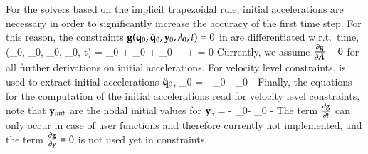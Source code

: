 %
For the solvers based on the implicit trapezoidal rule, initial accelerations are necessary in order to significantly increase the accuracy
of the first time step.
For this reason, the constraints $\mathbf{g}(\mathbf{q}_0, \dot {\mathbf{q}}_0, \mathbf{y}_0, \mbox{\boldmath $\lambda$ \unboldmath}\!\!_0, t) = 0$ in  are differentiated w.r.t.\ time,
\be \label{eq_initialAccelerationsVel}
	\dot \gv(\qv_0, \dot \qv_0, \yv_0, \tlambda_0, t) = 
	\frac{\partial \gv}{\partial \qv} \dot \qv_0 + 
	\frac{\partial \gv}{\partial \dot \qv}\ddot \qv_0 +
	\frac{\partial \gv}{\partial \yv} \dot \yv_0 + 
	\frac{\partial \gv}{\partial \tlambda} \dot \tlambda +
	 = 0 \eqDot 
\ee
Currently, we assume $\frac{\partial \mathbf{g}}{\partial \mbox{\boldmath $\lambda$ \unboldmath}\!\!} = 0$ for all further derivations on initial accelerations.
For velocity level constraints,  is used to extract initial accelerations $\ddot {\mathbf{q}}_0$,
\be
  \frac{\partial \gv}{\partial \dot \qv}\ddot \qv_0 = %
	  -\frac{\partial \gv}{\partial \qv} \dot \qv_0 
		-\frac{\partial \gv}{\partial \yv} \dot \yv_0
		-	 \eqDot
\ee
%
Finally, the equations for the computation of the initial accelerations read for velocity level constraints,
note that $\mathbf{y}_{init}$ are the nodal initial values for $\mathbf{y}$,
\be \label{eq_initialAccelerationsVel2}
	   {\Null}{\Im}{\Null}
		 {\frac{\partial \gv}{\partial \dot \qv}}{\Null}{\Null}
   = 
	      {-\frac{\partial \gv}{\partial \qv} \dot \qv_0-\frac{\partial \gv}{\partial \yv} \dot \yv_0 - }  \eqComma
\ee
%
The term $\frac{\partial \mathbf{g}}{\partial t}$ can only occur in case of user functions and therefore currently not implemented, and the  term $\frac{\partial \mathbf{g}}{\partial \mathbf{y}} = 0$ is not used yet in constraints.

